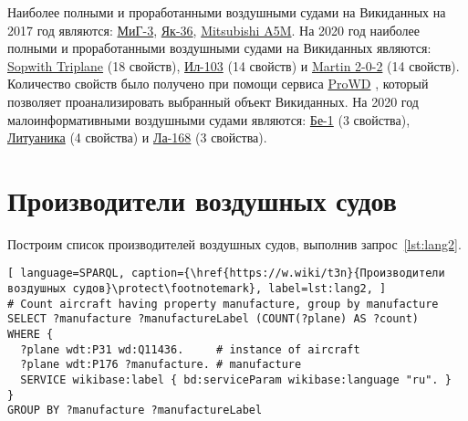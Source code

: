 
Наиболее полными и проработанными воздушными судами на Викиданных на 2017 год являются: \href{https://www.wikidata.org/wiki/Q271446}{МиГ-3}, \href{https://www.wikidata.org/wiki/Q1349098}{Як-36}, \href{https://www.wikidata.org/wiki/Q429839}{Mitsubishi A5M}. На 2020 год наиболее полными и проработанными воздушными судами на Викиданных являются: \href{https://www.wikidata.org/wiki/Q770863}{Sopwith Triplane} (18 свойств), \href{https://www.wikidata.org/wiki/Q1658673}{Ил-103} (14 свойств) и \href{https://www.wikidata.org/wiki/Q665071}{Martin 2-0-2} (14 свойств).
Количество свойств было получено при помощи сервиса \href{https://prowd.id/dashboards/972cd00ce110/profile}{ProWD} \cite{aircraft_prowd}, который позволяет проанализировать выбранный объект Викиданных.
На 2020 год малоинформативными воздушными судами являются: \href{https://www.wikidata.org/wiki/Q820603}{Бе-1} (3 свойства), \href{https://www.wikidata.org/wiki/Q117984}{Литуаника} (4 свойства) и \href{https://www.wikidata.org/wiki/Q572762}{Ла-168} (3 свойства).

\section{Производители воздушных судов}

Построим список производителей воздушных судов, выполнив запрос~\ref{lst:lang2}.

\begin{lstlisting}[ language=SPARQL, caption={\href{https://w.wiki/t3n}{Производители воздушных судов}\protect\footnotemark}, label=lst:lang2, ]
# Count aircraft having property manufacture, group by manufacture
SELECT ?manufacture ?manufactureLabel (COUNT(?plane) AS ?count) 
WHERE {
  ?plane wdt:P31 wd:Q11436.     # instance of aircraft
  ?plane wdt:P176 ?manufacture. # manufacture
  SERVICE wikibase:label { bd:serviceParam wikibase:language "ru". }
}
GROUP BY ?manufacture ?manufactureLabel
\end{lstlisting}

